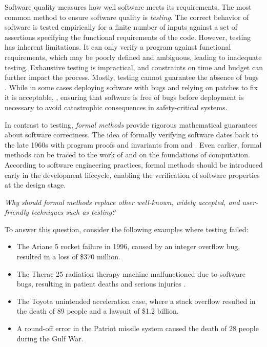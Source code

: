 Software quality measures how well software meets its requirements.
The most common method to ensure software quality is \emph{testing}.
The correct behavior of software is tested empirically for a finite number of inputs against a set of assertions specifying the functional requirements of the code.
However, testing has inherent limitations.
It can only verify a program against functional requirements, which may be poorly defined and ambiguous, leading to inadequate testing.
Exhaustive testing is impractical, and constraints on time and budget can further impact the process.
Mostly, testing cannot guarantee the absence of bugs .
While in some cases deploying software with bugs and relying on patches to fix it is acceptable, \cf{} , ensuring that software is free of bugs before deployment is necessary to avoid catastrophic consequences in safety-critical systems.

In contrast to testing, \emph{formal methods} provide rigorous mathematical guarantees about software correctness.
The idea of formally verifying software dates back to the late 1960s with program proofs and invariants from  and .
Even earlier, formal methods can be traced to the work of  and  on the foundations of computation.
According to software engineering practices, formal methods should be introduced early in the development lifecycle, enabling the verification of software properties at the design stage.

\begin{center}\em
  Why should formal methods replace other well-known, widely accepted, and user-friendly techniques such as testing?
\end{center}

To answer this question, consider the following examples where testing failed:

\begin{itemize}
\item The Ariane 5 rocket failure in 1996, caused by an integer overflow bug, resulted in a loss of \$370 million.
\item The Therac-25 radiation therapy machine malfunctioned due to software bugs, resulting in patient deaths and serious injuries .
\item The Toyota unintended acceleration case, where a stack overflow resulted in the death of 89 people and a lawsuit of \$1.2 billion.
\item A round-off error in the Patriot missile system caused the death of 28 people during the Gulf War.
\end{itemize}

